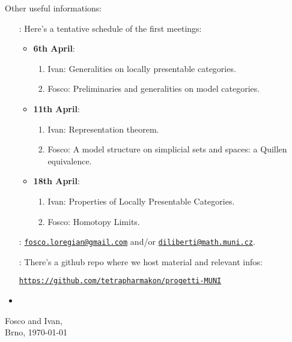 \documentclass{article}
\begin{document}
Other useful informations:
\begin{itemize}
\item[\faCalendarCheckO \; :] Here's a tentative schedule of the first meetings:
\begin{itemize}
\item \textbf{6th April}: 
\begin{enumerate}
\item Ivan: Generalities on locally presentable categories. 
\item Fosco: Preliminaries and generalities on model categories.
\end{enumerate}
\item \textbf{11th April}:
\begin{enumerate}
\item Ivan: Representation theorem. 
\item Fosco: A model structure on simplicial sets and spaces: a Quillen equivalence.
\end{enumerate} 
\item \textbf{18th April}: 
\begin{enumerate}
\item Ivan: Properties of Locally Presentable Categories. 
\item Fosco: Homotopy Limits.
\end{enumerate}
\end{itemize}
\item[\faEnvelopeO \; :] \href{mailto:fosco.loregian@gmail.com}{\tt fosco.loregian@gmail.com} and/or \href{mailto:diliberti@math.muni.cz}{\tt diliberti@math.muni.cz}.
\item[\faGithub \; :] There's a github repo where we host material and relevant infos: 
\begin{center}\href{https://github.com/tetrapharmakon/progetti-MUNI}{\tt https://github.com/tetrapharmakon/progetti-MUNI}
\end{center}
\item
\end{itemize}
\begin{flushright}
Fosco and Ivan,\\ 
Brno, \today
\end{flushright}
\end{document}
